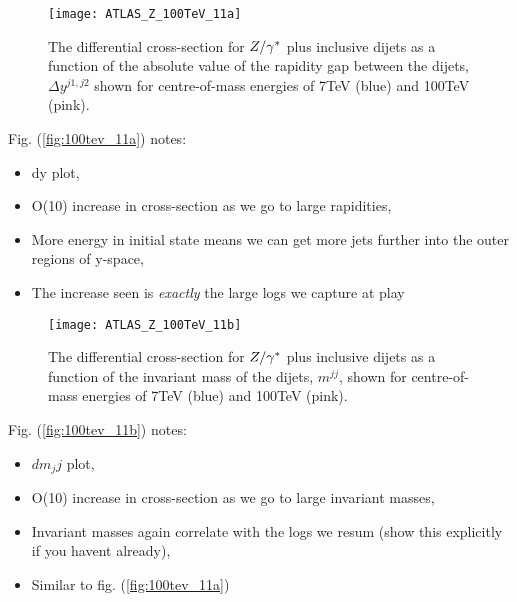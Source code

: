 	\begin{figure}[bth]
		\centering
		\texttt{[image: ATLAS\_Z\_100TeV\_11a]}
		\caption{The differential cross-section for $Z/\gamma^*$ plus inclusive dijets as a function of the absolute value of the
		         rapidity gap between the dijets, $\Delta y^{j1, j2}$ shown for centre-of-mass energies of 7TeV (blue) and
		         100TeV (pink).}
		\label{fig:100tev_11a}
	\end{figure}

	Fig. (\eqref{fig:100tev_11a}) notes:

	\begin{itemize}
		\item dy plot,
		\item O(10) increase in cross-section as we go to large rapidities,
		\item More energy in initial state means we can get more jets further into the outer regions of y-space,
		\item The increase seen is \emph{exactly} the large logs we capture at play
	\end{itemize}

	\begin{figure}[bth]
		\centering
		\texttt{[image: ATLAS\_Z\_100TeV\_11b]}
		\caption{The differential cross-section for $Z/\gamma^*$ plus inclusive dijets as a function of the invariant mass
		         of the dijets, $m^{jj}$, shown for centre-of-mass energies of 7TeV (blue) and 100TeV (pink).}
		\label{fig:100tev_11b}
	\end{figure}

	Fig. (\eqref{fig:100tev_11b}) notes:

	\begin{itemize}
		\item $dm_jj$ plot,
		\item O(10) increase in cross-section as we go to large invariant masses,
		\item Invariant masses again correlate with the logs we resum (show this explicitly if you havent already),
		\item Similar to fig. (\eqref{fig:100tev_11a})
	\end{itemize}

